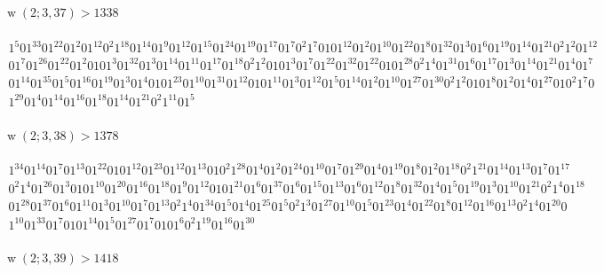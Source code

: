 \documentclass[final,3p,times]{elsarticle}
\theoremstyle{definition}
\DeclareMathOperator{\vdw}{w}
\begin{document}
\begin{appendix}
\paragraph{$\vdw(2; 3, 37) > 1338$}

\begin{gather*}
  1^{5}01^{33}01^{22}01^{2}01^{12}0^{2}1^{18}01^{14}01^{9}01^{12}01^{15}01^{24}01^{19}01^{17}01^{7}0^{2}1^{7}0101^{12}01^{2}01^{10}01^{22}01^{8}01^{32}01^{3}01^{6}01^{19}01^{14}01^{21}0^{2}1^{2}01^{12}\\
  01^{7}01^{26}01^{22}01^{2}0101^{3}01^{32}01^{3}01^{14}01^{11}01^{17}01^{18}0^{2}1^{2}0101^{3}01^{7}01^{22}01^{32}01^{22}0101^{28}0^{2}1^{4}01^{31}01^{6}01^{17}01^{3}01^{14}01^{21}01^{4}01^{7}\\
  01^{14}01^{35}01^{5}01^{16}01^{19}01^{3}01^{4}0101^{23}01^{10}01^{31}01^{12}0101^{11}01^{3}01^{12}01^{5}01^{14}01^{2}01^{10}01^{27}01^{30}0^{2}1^{2}0101^{8}01^{2}01^{4}01^{27}010^{2}1^{7}0\\
  1^{29}01^{4}01^{14}01^{16}01^{18}01^{14}01^{21}0^{2}1^{11}01^{5}
\end{gather*}


\paragraph{$\vdw(2; 3, 38) > 1378$}

\begin{gather*}
  1^{34}01^{14}01^{7}01^{13}01^{22}0101^{12}01^{23}01^{12}01^{13}010^{2}1^{28}01^{4}01^{2}01^{24}01^{10}01^{7}01^{29}01^{4}01^{19}01^{8}01^{2}01^{18}0^{2}1^{21}01^{14}01^{13}01^{7}01^{17}\\
  0^{2}1^{4}01^{26}01^{3}0101^{10}01^{20}01^{16}01^{18}01^{9}01^{12}0101^{21}01^{6}01^{37}01^{6}01^{15}01^{13}01^{6}01^{12}01^{8}01^{32}01^{4}01^{5}01^{19}01^{3}01^{10}01^{21}0^{2}1^{4}01^{18}\\
  01^{28}01^{37}01^{6}01^{11}01^{3}01^{10}01^{7}01^{13}0^{2}1^{4}01^{34}01^{5}01^{4}01^{25}01^{5}0^{2}1^{3}01^{27}01^{10}01^{5}01^{23}01^{4}01^{22}01^{8}01^{12}01^{16}01^{13}0^{2}1^{4}01^{20}0\\
  1^{10}01^{33}01^{7}0101^{14}01^{5}01^{27}01^{7}0101^{6}0^{2}1^{19}01^{16}01^{30}
\end{gather*}

\paragraph{$\vdw(2; 3, 39) > 1418$}


\end{appendix}
\end{document}
